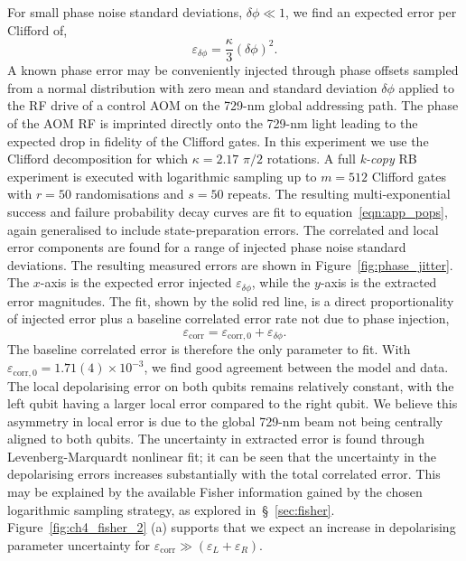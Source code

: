 For small phase noise standard deviations, $\delta\phi \ll 1$, we find an expected error per Clifford of,
\begin{equation}
\varepsilon_{\delta\phi} = \frac{\kappa}{3}(\delta\phi)^2.
\end{equation}
A known phase error may be conveniently injected through phase offsets sampled from a normal distribution with zero mean and standard deviation $\delta\phi$ applied to the RF drive of a control AOM on the 729-nm global addressing path. The phase of the AOM RF is imprinted directly onto the 729-nm light leading to the expected drop in fidelity of the Clifford gates.
In this experiment we use the Clifford decomposition for which $\kappa=2.17$ $\pi/2$ rotations. A full \emph{k-copy} RB experiment is executed with logarithmic sampling up to $m=512$ Clifford gates with $r=50$ randomisations and $s=50$ repeats. The resulting multi-exponential success and failure probability decay curves are fit to equation~\ref{eqn:app_pops}, again generalised to include state-preparation errors.  The correlated and local error components are found for a range of injected phase noise standard deviations. The resulting measured errors are shown in Figure~\ref{fig:phase_jitter}. The $x$-axis is the expected error injected $\varepsilon_{\delta\phi}$, while the $y$-axis is the extracted error magnitudes. The fit, shown by the solid red line, is a direct proportionality of injected error plus a baseline correlated error rate not due to phase injection,
\begin{equation}
\varepsilon_\mathrm{corr} = \varepsilon_\mathrm{corr,0} + \varepsilon_{\delta\phi}.
\end{equation}
The baseline correlated error is therefore the only parameter to fit. With $\varepsilon_\mathrm{corr,0}= 1.71(4)\times10^{-3}$, we find good agreement between the model and data. 
The local depolarising error on both qubits remains relatively constant, with the left qubit having a larger local error compared to the right qubit. We believe this asymmetry in local error is due to the global 729-nm beam not being centrally aligned to both qubits. The uncertainty in extracted error is found through Levenberg-Marquardt nonlinear fit; it can be seen that the uncertainty in the depolarising errors increases substantially with the total correlated error. This may be explained by the available Fisher information gained by the chosen logarithmic sampling strategy, as explored in~\S~\ref{sec:fisher}. Figure~\ref{fig:ch4_fisher_2} (a) supports that we expect an increase in depolarising parameter uncertainty for $\varepsilon_\mathrm{corr} \gg (\varepsilon_L + \varepsilon_R)$.


